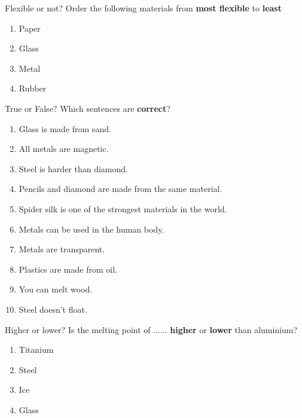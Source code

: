 \documentclass[a4paper, 12pt]{article}
\begin{document}
	\pagestyle{empty}
	\begin{question}[colback=red!10]{Flexible or not?}
  		Order the following materials from \textbf{most flexible} to \textbf{least}
  		
  		\begin{enumerate}[font=\bfseries]
  		\centering
  			\item Paper
  			\item Glass
  			\item Metal
  			\item Rubber
  		\end{enumerate}
	\end{question}
	\begin{question}[]{True or False?}
  		Which sentences are \textbf{correct}?
  		
  		\begin{multicols}{2}
  		\begin{enumerate}[font=\bfseries]
  			\item Glass is made from sand.
  			\item All metals are magnetic.
  			\item Steel is harder than diamond.
  			\item Pencils and diamond are made from the same material.
  			\item Spider silk is one of the strongest materials in the world.
  			\item Metals can be used in the human body.
  			\item Metals are transparent.
  			\item Plastics are made from oil.
  			\item You can melt wood.
  			\item Steel doesn’t float.
  		\end{enumerate}
  		\end{multicols}
	\end{question}
	\newpage
	\begin{question}[colback=green!10]{Higher or lower?}
  		Is the melting point of ...... \textbf{higher} or \textbf{lower} than aluminium?
  		\begin{enumerate}
  		\centering
  			\item Titanium
  			\item Steel
  			\item Ice
  			\item Glass
  		\end{enumerate}
	\end{question}
\end{document}
